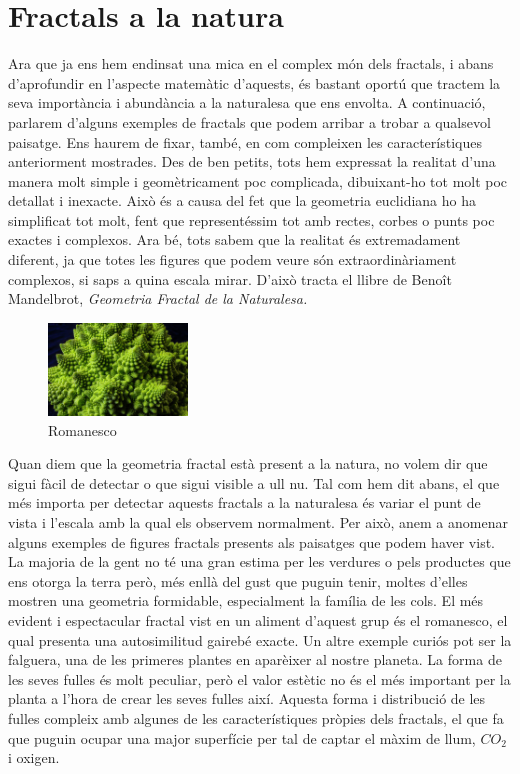 \documentclass[12pt]{report}
\begin{document}
\section{Fractals a la natura}
Ara que ja ens hem endinsat una mica en el complex món dels fractals, i abans d'aprofundir en l'aspecte matemàtic d'aquests, és bastant oportú que tractem la seva importància i abundància a la naturalesa que ens envolta. A continuació, parlarem d'alguns exemples de fractals que podem arribar a trobar a qualsevol paisatge. Ens haurem de fixar, també, en com compleixen les característiques anteriorment mostrades.
\newline
Des de ben petits, tots hem expressat la realitat d'una manera molt simple i geomètricament poc complicada, dibuixant-ho tot molt poc detallat i inexacte. Això és a causa del fet que la geometria euclidiana ho ha simplificat tot molt, fent que representéssim tot amb rectes, corbes o punts poc exactes i complexos. Ara bé, tots sabem que la realitat és extremadament diferent, ja que totes les figures que podem veure són extraordinàriament complexos, si saps a quina escala mirar. D'això tracta el llibre de Benoît Mandelbrot, \textit{Geometria Fractal de la Naturalesa.}
\newline
\begin{figure}
    \includegraphics[width=0.33\textwidth]{romanesco.jpg}
    \caption{Romanesco}
    \end{figure}
Quan diem que la geometria fractal està present a la natura, no volem dir que sigui fàcil de detectar o que sigui visible a ull nu. Tal com hem dit abans, el que més importa per detectar aquests fractals a la naturalesa és variar el punt de vista i l'escala amb la qual els observem normalment. Per això, anem a anomenar alguns exemples de figures fractals presents als paisatges que podem haver vist.
\newline
\newline
\newline
La majoria de la gent no té una gran estima per les verdures o pels productes que ens otorga la terra però, més enllà del gust que puguin tenir, moltes d'elles mostren una geometria formidable, especialment la família de les cols. El més evident i espectacular fractal vist en un aliment d'aquest grup és el romanesco, el qual presenta una autosimilitud gairebé exacte.
\newline
\newline
Un altre exemple curiós pot ser la falguera, una de les primeres plantes en aparèixer al nostre planeta. La forma de les seves fulles és molt peculiar, però el valor estètic no és el més important per la planta a l'hora de crear les seves fulles així. Aquesta forma i distribució de les fulles compleix amb algunes de les característiques pròpies dels fractals, el que fa que puguin ocupar una major superfície per tal de captar el màxim de llum, $CO_2$ i oxigen.
\end{document}
